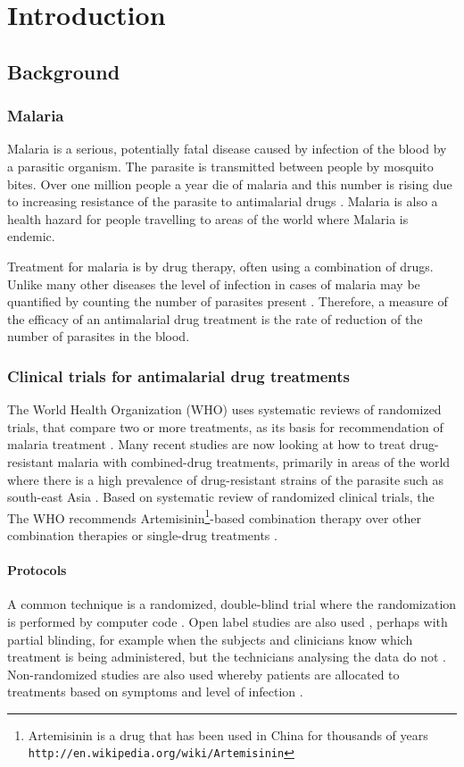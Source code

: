 \chapter{Introduction}\label{ch:intro}
\section{Background}
\subsection{Malaria}
Malaria is a serious, potentially fatal disease caused by infection of the blood by a parasitic organism. The parasite is transmitted between people by mosquito bites. Over one million people a year die of malaria and this number is rising due to increasing resistance of the parasite to antimalarial drugs \cite{who}. Malaria is also a health hazard for people travelling to areas of the world where Malaria is endemic.

Treatment for malaria is by drug therapy, often using a combination of drugs. Unlike many other diseases the level of infection in cases of malaria may be quantified by counting the number of parasites present \cite{white}. Therefore, a measure of the efficacy of an antimalarial drug treatment is the rate of reduction of the number of parasites in the blood. 

\subsection{Clinical trials for antimalarial drug treatments}
The World Health Organization (WHO) uses systematic reviews of randomized trials, that compare two or more treatments, as its basis for recommendation of malaria treatment \cite{who}. Many recent studies are now looking at how to treat drug-resistant malaria with combined-drug treatments, primarily in areas of the world where there is a high prevalence of drug-resistant strains of the parasite such as south-east Asia \cite{smithuis}. Based on systematic review of randomized clinical trials, the The WHO recommends Artemisinin\footnote{Artemisinin is a drug that has been used in China for thousands of years \texttt{http://en.wikipedia.org/wiki/Artemisinin}}-based combination therapy over other combination therapies or single-drug treatments \cite{who}. 

\subsubsection*{Protocols}
A common technique is a randomized, double-blind trial where the randomization is performed by computer code \cite{bell, newton, vries}. Open label studies are also used \cite{smithuis, wootton}, perhaps with partial blinding, for example when the subjects and clinicians know which treatment is being administered, but the technicians analysing the data do not \cite{wootton}. Non-randomized studies are also used whereby patients are allocated to treatments based on symptoms and level of infection \cite{carmello}.

